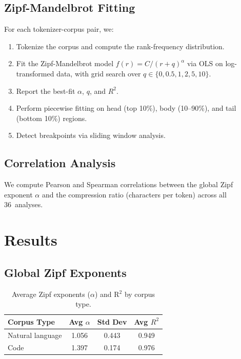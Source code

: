 \documentclass[11pt]{article}
\begin{document}
\subsection{Zipf-Mandelbrot Fitting}

For each tokenizer-corpus pair, we:
\begin{enumerate}
  \item Tokenize the corpus and compute the rank-frequency distribution.
  \item Fit the Zipf-Mandelbrot model $f(r) = C/(r+q)^\alpha$ via OLS on log-transformed data, with grid search over $q \in \{0, 0.5, 1, 2, 5, 10\}$.
  \item Report the best-fit $\alpha$, $q$, and $R^2$.
  \item Perform piecewise fitting on head (top 10\%), body (10--90\%), and tail (bottom 10\%) regions.
  \item Detect breakpoints via sliding window analysis.
\end{enumerate}

\subsection{Correlation Analysis}

We compute Pearson and Spearman correlations between the global Zipf exponent $\alpha$ and the compression ratio (characters per token) across all 36~analyses.

\section{Results}

\subsection{Global Zipf Exponents}

\begin{table}[h]
\centering
\caption{Average Zipf exponents ($\alpha$) and R$^2$ by corpus type.}
\label{tab:summary}
\begin{tabular}{lccc}
\toprule
Corpus Type & Avg $\alpha$ & Std Dev & Avg $R^2$ \\
\midrule
Natural language & 1.056 & 0.443 & 0.949 \\
Code & 1.397 & 0.174 & 0.976 \\
\bottomrule
\end{tabular}
\end{table}
\end{document}
